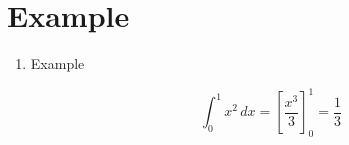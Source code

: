 \documentclass{homework-template}
\begin{document}
\section{Example}
\begin{enumerate}
    \item Example

    \begin{answer}
        \[\int_{0}^{1} x^2 \, dx = \left[\frac{x^3}{3}\right]_{0}^{1} = \frac{1}{3}\]
    \end{answer}
\end{enumerate}
\end{document}
